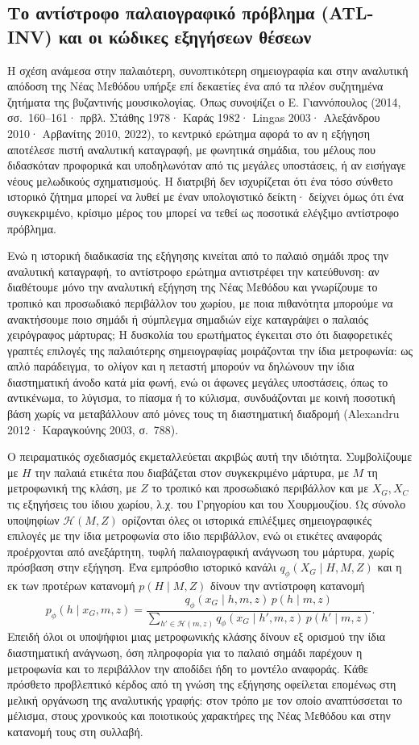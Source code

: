 \documentclass[11pt,a4paper]{article}
\begin{document}
\subsection{Το αντίστροφο παλαιογραφικό πρόβλημα (ATL-INV) και οι κώδικες εξηγήσεων θέσεων}

Η σχέση ανάμεσα στην παλαιότερη, συνοπτικότερη σημειογραφία και στην αναλυτική απόδοση της Νέας Μεθόδου υπήρξε επί δεκαετίες ένα από τα πλέον συζητημένα ζητήματα της βυζαντινής μουσικολογίας. Όπως συνοψίζει ο Ε. Γιαννόπουλος (2014, σσ.~160--161· πρβλ. Στάθης 1978· Καράς 1982· Lingas 2003· Αλεξάνδρου 2010· Αρβανίτης 2010, 2022), το κεντρικό ερώτημα αφορά το αν η εξήγηση αποτέλεσε πιστή αναλυτική καταγραφή, με φωνητικά σημάδια, του μέλους που διδασκόταν προφορικά και υποδηλωνόταν από τις μεγάλες υποστάσεις, ή αν εισήγαγε νέους μελωδικούς σχηματισμούς. Η διατριβή δεν ισχυρίζεται ότι ένα τόσο σύνθετο ιστορικό ζήτημα μπορεί να λυθεί με έναν υπολογιστικό δείκτη· δείχνει όμως ότι ένα συγκεκριμένο, κρίσιμο μέρος του μπορεί να τεθεί ως ποσοτικά ελέγξιμο αντίστροφο πρόβλημα.

Ενώ η ιστορική διαδικασία της εξήγησης κινείται από το παλαιό σημάδι προς την αναλυτική καταγραφή, το αντίστροφο ερώτημα αντιστρέφει την κατεύθυνση: αν διαθέτουμε μόνο την αναλυτική εξήγηση της Νέας Μεθόδου και γνωρίζουμε το τροπικό και προσωδιακό περιβάλλον του χωρίου, με ποια πιθανότητα μπορούμε να ανακτήσουμε ποιο σημάδι ή σύμπλεγμα σημαδιών είχε καταγράψει ο παλαιός χειρόγραφος μάρτυρας; Η δυσκολία του ερωτήματος έγκειται στο ότι διαφορετικές γραπτές επιλογές της παλαιότερης σημειογραφίας μοιράζονται την ίδια μετροφωνία: ως απλό παράδειγμα, το ολίγον και η πεταστή μπορούν να δηλώνουν την ίδια διαστηματική άνοδο κατά μία φωνή, ενώ οι άφωνες μεγάλες υποστάσεις, όπως το αντικένωμα, το λύγισμα, το πίασμα ή το κύλισμα, συνδυάζονται με κοινή ποσοτική βάση χωρίς να μεταβάλλουν από μόνες τους τη διαστηματική διαδρομή (Alexandru 2012· Καραγκούνης 2003, σ.~788).

Ο πειραματικός σχεδιασμός εκμεταλλεύεται ακριβώς αυτή την ιδιότητα. Συμβολίζουμε με $H$ την παλαιά ετικέτα που διαβάζεται στον συγκεκριμένο μάρτυρα, με $M$ τη μετροφωνική της κλάση, με $Z$ το τροπικό και προσωδιακό περιβάλλον και με $X_G,X_C$ τις εξηγήσεις του ίδιου χωρίου, λ.χ. του Γρηγορίου και του Χουρμουζίου. Ως σύνολο υποψηφίων $\mathcal H(M,Z)$ ορίζονται όλες οι ιστορικά επιλέξιμες σημειογραφικές επιλογές με την ίδια μετροφωνία στο ίδιο περιβάλλον, ενώ οι ετικέτες αναφοράς προέρχονται από ανεξάρτητη, τυφλή παλαιογραφική ανάγνωση του μάρτυρα, χωρίς πρόσβαση στην εξήγηση. Ένα εμπρόσθιο ιστορικό κανάλι $q_\phi(X_G\mid H,M,Z)$ και η εκ των προτέρων κατανομή $p(H\mid M,Z)$ δίνουν την αντίστροφη κατανομή
\[
p_\phi(h\mid x_G,m,z)=\frac{q_\phi(x_G\mid h,m,z)\,p(h\mid m,z)}{\sum_{h'\in\mathcal H(m,z)}q_\phi(x_G\mid h',m,z)\,p(h'\mid m,z)}.
\]
Επειδή όλοι οι υποψήφιοι μιας μετροφωνικής κλάσης δίνουν εξ ορισμού την ίδια διαστηματική ανάγνωση, όση πληροφορία για το παλαιό σημάδι παρέχουν η μετροφωνία και το περιβάλλον την αποδίδει ήδη το μοντέλο αναφοράς. Κάθε πρόσθετο προβλεπτικό κέρδος από τη γνώση της εξήγησης οφείλεται επομένως στη μελική οργάνωση της αναλυτικής γραφής: στον τρόπο με τον οποίο αναπτύσσεται το μέλισμα, στους χρονικούς και ποιοτικούς χαρακτήρες της Νέας Μεθόδου και στην κατανομή τους στη συλλαβή.
\end{document}
